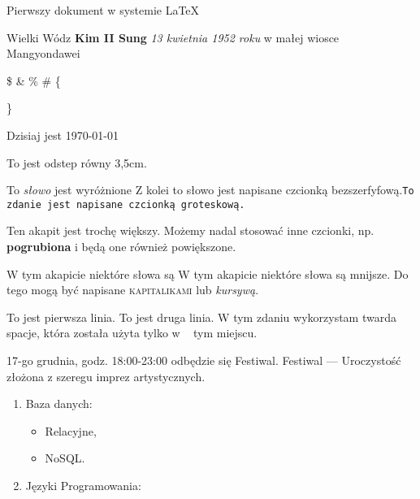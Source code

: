 \documentclass[11pt, a4paper]{article}
\begin{document}
Pierwszy dokument w systemie \LaTeX

\Large {Wielki Wódz} \small \textbf {Kim II Sung} \textit{13 kwietnia 1952 roku} \tiny w małej wiosce Mangyondawei 
\normalsize 

\$ \& \% \# \{{ \}

Dzisiaj jest \today 

To jest \hspace{3.5cm}odstep równy 3,5cm.

To \emph{słowo} jest wyróżnione Z kolei to \textsf{słowo} jest napisane czcionką bezszerfyfową.\texttt{To zdanie jest napisane czcionką groteskową.}

{\large Ten akapit jest trochę większy. Możemy nadal stosować inne czcionki, np. \textbf{pogrubiona} i będą one również powiększone.} 

{\small W tym akapicie niektóre słowa są {\tiny W tym akapicie niektóre słowa są mnijsze. Do tego mogą być napisane \textsc{kapitalikami} lub 
\textit{kursywą}.} \newline

To jest pierwsza linia. \newline
To jest druga linia. \newline
	W tym zdaniu wykorzystam twarda spacje,  która została użyta tylko w ~ tym miejscu.
	
17-go grudnia, godz. 18:00-23:00 odbędzie się Festiwal. \newline
Festiwal --- Uroczystość złożona z szeregu imprez artystycznych.
\newline

\begin{enumerate}
\item Baza danych:
\begin{itemize}
\item Relacyjne,
\item NoSQL.
\end{itemize}
\item Języki Programowania:

\end{enumerate}

}}
\end{document}
